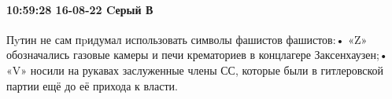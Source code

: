  
 
 
 
 


\paragraph{10:59:28 16-08-22 Cерый В}

Пyтин не сам пpидумал использовать символы фашистов фашистов:• «Z» обозначались
газовые камеры и печи крематориев в концлагере Заксенхаузен;• «V» носили на
рукавах заслуженные члены СС, которые были в гитлеровской партии ещё до её
прихода к власти.

